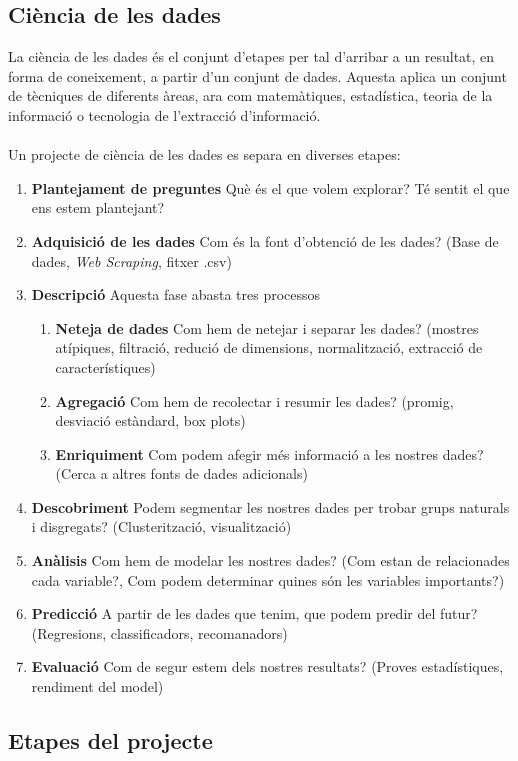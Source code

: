 \documentclass[12pt,a4paper,catalan]{article}
\begin{document}
\subsection{Ciència de les dades}
La ciència de les dades és el conjunt d'etapes per tal d'arribar a un resultat, en forma de coneixement, a partir d'un conjunt de dades. Aquesta aplica un conjunt de tècniques de diferents àreas, ara com matemàtiques, estadística, teoria de la informació o tecnologia de l'extracció d'informació.
\\
\\
Un projecte de ciència de les dades es separa en diverses etapes:
\begin{enumerate}
	\item \textbf{Plantejament de preguntes} Què és el que volem explorar? Té sentit el que ens estem plantejant?
	\item \textbf{Adquisició de les dades} Com és la font d'obtenció de les dades? (Base de dades, \textit{Web Scraping}, fitxer .csv)
	\item \textbf{Descripció} Aquesta fase abasta tres processos
	\begin{enumerate}
		\item \textbf{Neteja de dades} Com hem de netejar i separar les dades? (mostres atípiques, filtració, redució de dimensions, normalització, extracció de característiques)
		\item \textbf{Agregació} Com hem de recolectar i resumir les dades? (promig, desviació estàndard, box plots)
		\item \textbf{Enriquiment} Com podem afegir més informació a les nostres dades? (Cerca a altres fonts de dades adicionals)
	\end{enumerate}
	\item \textbf{Descobriment} Podem segmentar les nostres dades per trobar grups naturals i disgregats? (Clusterització, visualització)
	\item \textbf{Anàlisis} Com hem de modelar les nostres dades? (Com estan de relacionades cada variable?, Com podem determinar quines són les variables importants?)
	\item \textbf{Predicció} A partir de les dades que tenim, que podem predir del futur? (Regresions, classificadors, recomanadors)
	\item \textbf{Evaluació} Com de segur estem dels nostres resultats? (Proves estadístiques, rendiment del model)
\end{enumerate}

\subsection{Etapes del projecte}
\end{document}
